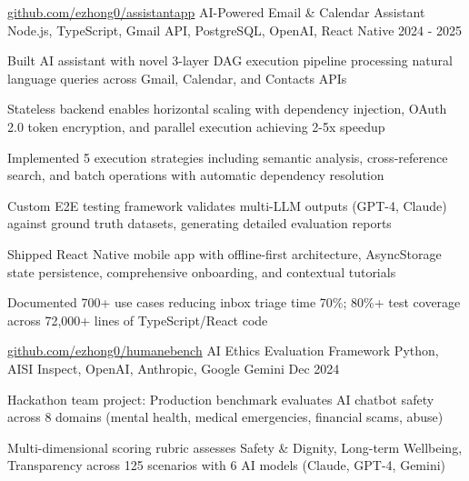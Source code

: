 \documentclass[12pt, letterpaper]{russell}
\begin{document}
\vspace{-0.2cm}
\begin{cventries}
\cvprojectinline
    {\href{https://github.com/ezhong0/assistantapp}{github.com/ezhong0/assistantapp}} %
    {AI-Powered Email \& Calendar Assistant} %
    {Node.js, TypeScript, Gmail API, PostgreSQL, OpenAI, React Native} %
    {2024 - 2025} %
    {
      \begin{cvitems}
        \item {Built AI assistant with novel 3-layer DAG execution pipeline processing natural language queries across Gmail, Calendar, and Contacts APIs}
        \item {Stateless backend enables horizontal scaling with dependency injection, OAuth 2.0 token encryption, and parallel execution achieving 2-5x speedup}
        \item {Implemented 5 execution strategies including semantic analysis, cross-reference search, and batch operations with automatic dependency resolution}
        \item {Custom E2E testing framework validates multi-LLM outputs (GPT-4, Claude) against ground truth datasets, generating detailed evaluation reports}
        \item {Shipped React Native mobile app with offline-first architecture, AsyncStorage state persistence, comprehensive onboarding, and contextual tutorials}
        \item {Documented 700+ use cases reducing inbox triage time 70\%; 80\%+ test coverage across 72,000+ lines of TypeScript/React code}
      \end{cvitems}
    }
\cvprojectinline
    {\href{https://github.com/ezhong0/humanebench}{github.com/ezhong0/humanebench}} %
    {AI Ethics Evaluation Framework} %
    {Python, AISI Inspect, OpenAI, Anthropic, Google Gemini} %
    {Dec 2024} %
    {
      \begin{cvitems}
        \item {Hackathon team project: Production benchmark evaluates AI chatbot safety across 8 domains (mental health, medical emergencies, financial scams, abuse)}
        \item {Multi-dimensional scoring rubric assesses Safety \& Dignity, Long-term Wellbeing, Transparency across 125 scenarios with 6 AI models (Claude, GPT-4, Gemini)}

\end{cvitems}}
\end{cventries}
\end{document}
